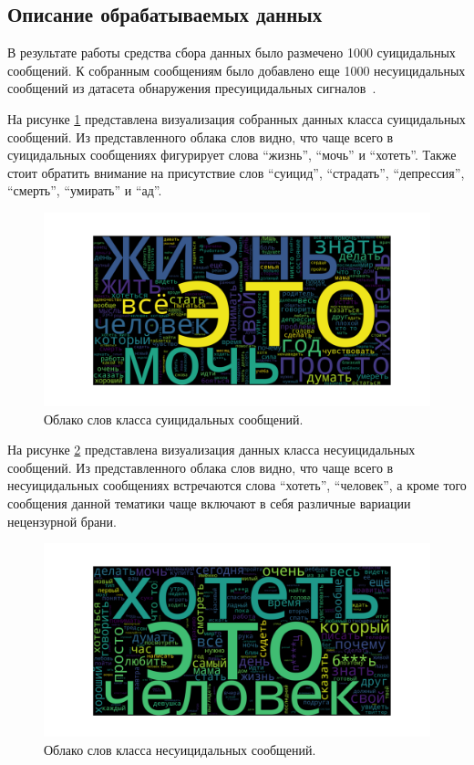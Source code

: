 \subsection{Описание обрабатываемых данных}

В результате работы средства сбора данных было размечено 1000 суицидальных сообщений. К собранным сообщениям было добавлено еще 1000 несуицидальных сообщений из датасета обнаружения пресуицидальных сигналов~\cite{dataset}. 

На рисунке \ref{img:cloud1} представлена визуализация собранных данных класса суицидальных сообщений. Из представленного облака слов видно, что чаще всего в суицидальных сообщениях фигурирует слова ``жизнь'', ``мочь'' и ``хотеть''. Также стоит обратить внимание на присутствие слов ``суицид'', ``страдать'', ``депрессия'', ``смерть'', ``умирать'' и ``ад''.

\begin{figure}[H]
	\centering
	\includegraphics[width=\textwidth]{inc/cloudSuicidal.pdf}
	\caption{ Облако слов класса суицидальных сообщений. }
	\label{img:cloud1}
\end{figure}

На рисунке \ref{img:cloud2} представлена визуализация данных класса несуицидальных сообщений. Из представленного облака слов видно, что чаще всего в несуицидальных сообщениях встречаются слова ``хотеть'', ``человек'', а кроме того сообщения данной тематики чаще включают в себя различные вариации нецензурной брани.

\begin{figure}[H]
	\centering
	\includegraphics[width=\textwidth]{inc/cloudNonSuicidal.pdf}
	\caption{ Облако слов класса несуицидальных сообщений. }
	\label{img:cloud2}
\end{figure}

